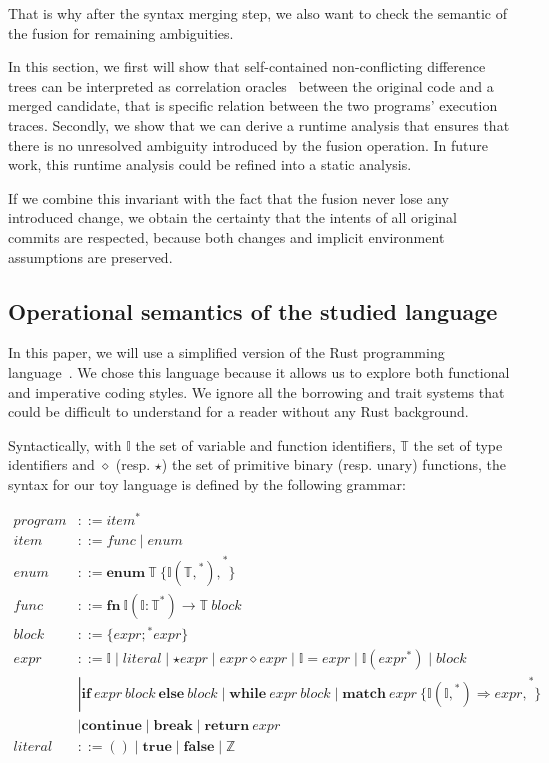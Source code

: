 \documentclass[a4paper,11pt]{article}
\newcommand\typsep{\mathrel{|}}
\newcommand\yrg[1]{{\color{red}{(\textbf{YRG:} #1)}}}
\begin{document}
That is why after the syntax merging step, we also want to check the
semantic of the fusion for remaining ambiguities.

In this section, we first will show that self-contained
non-conflicting difference trees can be interpreted as correlation
oracles~\yrg{Ref} between the original code and a merged candidate,
that is specific relation between the two programs' execution
traces. Secondly, we show that we can derive a runtime analysis that
ensures that there is no unresolved ambiguity introduced by the fusion
operation. In future work, this runtime analysis could be refined into
a static analysis.

If we combine this invariant with the fact that the fusion never lose
any introduced change, we obtain the certainty that the intents of all
original commits are respected, because both changes and implicit
environment assumptions are preserved.

\subsection{Operational semantics of the studied language}

In this paper, we will use a simplified version of the Rust
programming language~\yrg{Ref}. We chose this language because it
allows us to explore both functional and imperative coding styles.  We
ignore all the borrowing and trait systems that could be difficult to
understand for a reader without any Rust background.

\newcommand{\ident}{\mathbb{I}}
\newcommand{\typ}{\mathbb{T}}

Syntactically, with $\ident$ the set of variable and function
identifiers, $\typ$ the set of type identifiers and $\diamond$
(resp. $\star$) the set of primitive binary (resp. unary) functions,
the syntax for our toy language is defined by the following grammar:

\begin{align*}
program &::= \boxed{item}^*\\
item &::= func \typsep enum\\
enum &::= \mathbf{enum}\ \typ\ \{ \boxed{\ident(\boxed{\typ,}^*),}^* \}\\
func &::= \mathbf{fn}\ \ident(\boxed{\ident: \typ}^*) \rightarrow \typ\ block\\
block &::= \{ \boxed{expr;}^* expr \}\\
expr &::= \ident \typsep literal \typsep \star expr \typsep expr \diamond expr \typsep \ident = expr \typsep \ident(\boxed{expr}^*) \typsep block\\
&\typsep \mathbf{if}\ expr\ block\ \mathbf{else}\ block \typsep \mathbf{while}\ expr\ block \typsep \mathbf{match}\ expr\ \{ \boxed{\ident(\boxed{\ident,}^*) \Rightarrow expr,}^* \}\\
&\typsep \mathbf{continue} \typsep \mathbf{break} \typsep \textbf{return}\ expr\\
literal &::= () \typsep \mathbf{true} \typsep \mathbf {false} \typsep \mathbb{Z}
\end{align*}
\end{document}
